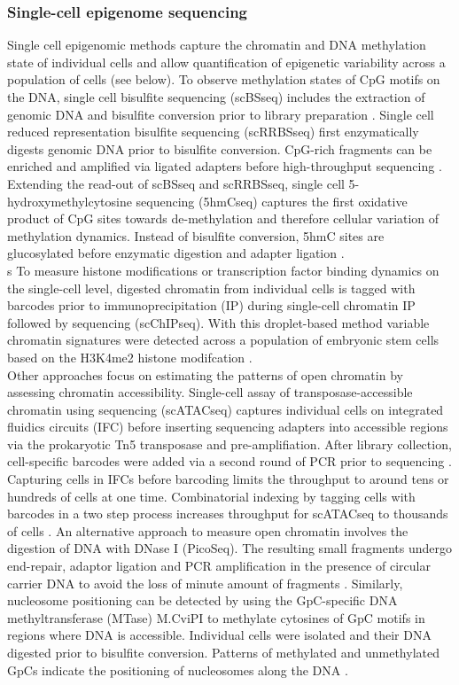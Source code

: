 \subsubsection{Single-cell epigenome sequencing}

Single cell epigenomic methods capture the chromatin and DNA methylation state of individual cells and allow quantification of epigenetic variability across a population of cells (see below)\citep{Clark2016}. To observe methylation states of CpG motifs on the DNA, single cell bisulfite sequencing (scBSseq) includes the extraction of genomic DNA and bisulfite conversion prior to library preparation \citep{Smallwood2014, Farlik2015}. Single cell reduced representation bisulfite sequencing (scRRBSseq) first enzymatically digests genomic DNA prior to bisulfite conversion. CpG-rich fragments can be enriched and amplified via ligated adapters before high-throughput sequencing \citep{Guo2013}. Extending the read-out of scBSseq and scRRBSseq, single cell 5-hydroxymethylcytosine sequencing (5hmCseq) captures the first oxidative product of CpG sites towards de-methylation and therefore cellular variation of methylation dynamics. Instead of bisulfite conversion, 5hmC sites are glucosylated before enzymatic digestion and adapter ligation \citep{Mooijman2016}. \\s
To measure histone modifications or transcription factor binding dynamics on the single-cell level, digested chromatin from individual cells is tagged with barcodes prior to immunoprecipitation (IP) during single-cell chromatin IP followed by sequencing (scChIPseq). With this droplet-based method variable chromatin signatures were detected across a population of embryonic stem cells based on the H3K4me2 histone modifcation \citep{Rotem2015}. \\ 
Other approaches focus on estimating the patterns of open chromatin by assessing chromatin accessibility. Single-cell assay of transposase-accessible chromatin using sequencing (scATACseq) captures individual cells on integrated fluidics circuits (IFC) before inserting sequencing adapters into accessible regions via the prokaryotic Tn5 transposase and pre-amplifiation. After library collection, cell-specific barcodes were added via a second round of PCR prior to sequencing \citep{Buenrostro2015}.  Capturing cells in IFCs before barcoding limits the throughput to around tens or hundreds of cells at one time. Combinatorial indexing by tagging cells with barcodes in a two step process increases throughput for scATACseq to thousands of cells \citep{Cusanovich2015}. An alternative approach to measure open chromatin involves the digestion of DNA with DNase I (PicoSeq). The resulting small fragments undergo end-repair, adaptor ligation and PCR amplification in the presence of circular carrier DNA to avoid the loss of minute amount of fragments \citep{Jin2015}. Similarly, nucleosome positioning can be detected by using the GpC-specific DNA methyltransferase (MTase) M.CviPI to methylate cytosines of GpC motifs in regions where DNA is accessible. Individual cells were isolated and their DNA digested prior to bisulfite conversion. Patterns of methylated and unmethylated GpCs indicate the positioning of nucleosomes along the DNA \citep{Small2014}.
